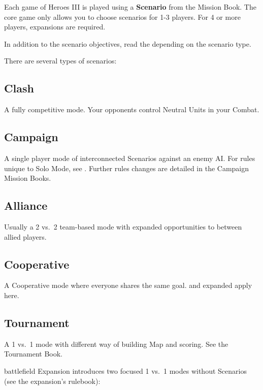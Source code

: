 
\begin{multicols*}{2}

Each game of Heroes III is played using a \textbf{Scenario} from the Mission Book.
The core game only allows you to choose scenarios for 1-3 players. For 4 or more players, expansions are required.\par
In addition to the scenario objectives, read the  depending on the scenario type.\par
There are several types of scenarios:

\subsection*{Clash}
A fully competitive mode.
Your opponents control Neutral Units in your Combat.

\subsection*{Campaign}
A single player mode of interconnected Scenarios against an enemy AI.
For rules unique to Solo Mode, see .
Further rules changes are detailed in the Campaign Mission Books.

\subsection*{Alliance}
Usually a 2 vs.~2 team-based mode with expanded opportunities to  between allied players.

\subsection*{Cooperative}
A Cooperative mode where everyone shares the same goal.  and expanded  apply here.

\subsection*{Tournament}
A 1 vs.~1 mode with different way of building Map and scoring. See the Tournament Book.

\columnbreak

\begin{expansion}{battlefield}
 Expansion introduces two focused 1 vs.~1 modes without Scenarios (see the expansion's rulebook):


\end{expansion}
\end{multicols*}

